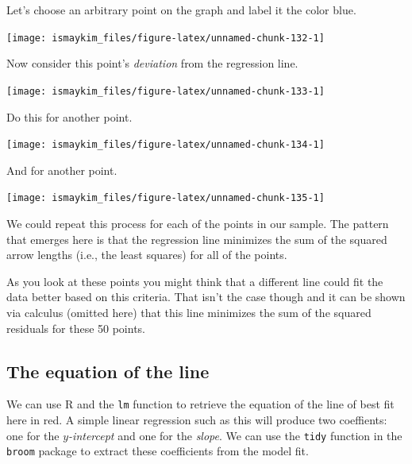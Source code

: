 \documentclass[]{tufte-book}
\newenvironment{Shaded}{\begin{snugshade}}{\end{snugshade}}
\newcommand{\KeywordTok}[1]{\textcolor[rgb]{0.13,0.29,0.53}{\textbf{{#1}}}}
\newcommand{\DataTypeTok}[1]{\textcolor[rgb]{0.13,0.29,0.53}{{#1}}}
\newcommand{\StringTok}[1]{\textcolor[rgb]{0.31,0.60,0.02}{{#1}}}
\newcommand{\NormalTok}[1]{{#1}}
\begin{document}
Let's choose an arbitrary point on the graph and label it the color
blue.

\begin{center}\texttt{[image: ismaykim\_files/figure-latex/unnamed-chunk-132-1]} \end{center}

Now consider this point's \emph{deviation} from the regression line.

\begin{center}\texttt{[image: ismaykim\_files/figure-latex/unnamed-chunk-133-1]} \end{center}

Do this for another point.

\begin{center}\texttt{[image: ismaykim\_files/figure-latex/unnamed-chunk-134-1]} \end{center}

And for another point.

\begin{center}\texttt{[image: ismaykim\_files/figure-latex/unnamed-chunk-135-1]} \end{center}

We could repeat this process for each of the points in our sample. The
pattern that emerges here is that the regression line minimizes the sum
of the squared arrow lengths (i.e., the least squares) for all of the
points.

As you look at these points you might think that a different line could
fit the data better based on this criteria. That isn't the case though
and it can be shown via calculus (omitted here) that this line minimizes
the sum of the squared residuals for these 50 points.

\subsection{The equation of the line}\label{the-equation-of-the-line}

We can use R and the \texttt{lm} function to retrieve the equation of
the line of best fit here in red. A simple linear regression such as
this will produce two coeffients: one for the \emph{\(y\)-intercept} and
one for the \emph{slope}. We can use the \texttt{tidy} function in the
\texttt{broom} package to extract these coefficients from the model fit.

\begin{Shaded}
\end{Shaded}
\end{document}
